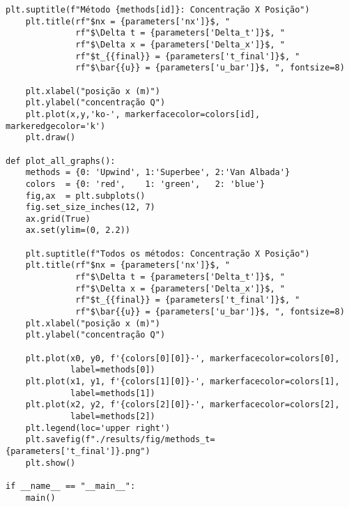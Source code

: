 \begin{Verbatim}[fontsize=\footnotesize]
    plt.suptitle(f"Método {methods[id]}: Concentração X Posição")
    plt.title(rf"$nx = {parameters['nx']}$, "
              rf"$\Delta t = {parameters['Delta_t']}$, "
              rf"$\Delta x = {parameters['Delta_x']}$, "
              rf"$t_{{final}} = {parameters['t_final']}$, "
              rf"$\bar{{u}} = {parameters['u_bar']}$, ", fontsize=8)

    plt.xlabel("posição x (m)")
    plt.ylabel("concentração Q")
    plt.plot(x,y,'ko-', markerfacecolor=colors[id], markeredgecolor='k')
    plt.draw()

def plot_all_graphs():
    methods = {0: 'Upwind', 1:'Superbee', 2:'Van Albada'}
    colors  = {0: 'red',    1: 'green',   2: 'blue'}
    fig,ax  = plt.subplots()
    fig.set_size_inches(12, 7)
    ax.grid(True)
    ax.set(ylim=(0, 2.2))

    plt.suptitle(f"Todos os métodos: Concentração X Posição")
    plt.title(rf"$nx = {parameters['nx']}$, "
              rf"$\Delta t = {parameters['Delta_t']}$, "
              rf"$\Delta x = {parameters['Delta_x']}$, "
              rf"$t_{{final}} = {parameters['t_final']}$, "
              rf"$\bar{{u}} = {parameters['u_bar']}$, ", fontsize=8)
    plt.xlabel("posição x (m)")
    plt.ylabel("concentração Q")

    plt.plot(x0, y0, f'{colors[0][0]}-', markerfacecolor=colors[0],
             label=methods[0])
    plt.plot(x1, y1, f'{colors[1][0]}-', markerfacecolor=colors[1],
             label=methods[1])
    plt.plot(x2, y2, f'{colors[2][0]}-', markerfacecolor=colors[2],
             label=methods[2])
    plt.legend(loc='upper right')
    plt.savefig(f"./results/fig/methods_t={parameters['t_final']}.png")
    plt.show()

if __name__ == "__main__":
    main()
\end{Verbatim}